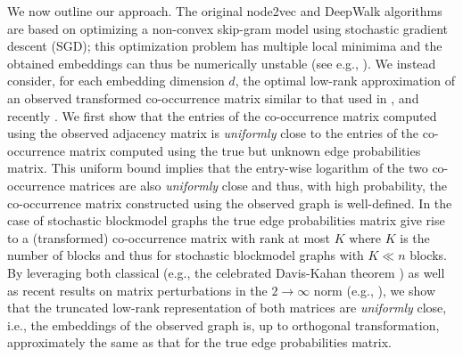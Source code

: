 \documentclass[10pt,journal,compsoc]{IEEEtran}
\numberwithin{equation}{section}
\begin{document}
We now outline our approach. The original node2vec and DeepWalk
algorithms are based on optimizing a non-convex skip-gram model using
stochastic gradient descent (SGD); this optimization problem has multiple local minimima and the obtained embeddings can thus
be numerically unstable (see e.g., \cite{surprising}). We instead consider, for each embedding
dimension $d$, the optimal low-rank approximation
of an observed transformed co-occurrence matrix similar to that used in 
\cite{levy2014neural,qiu2020concentration}, and recently \cite{barot2021community,sussman_vec}. We first
show that the entries of the co-occurrence matrix computed using
the observed adjacency matrix is {\em uniformly} close to the entries
of the co-occurrence matrix computed using the true but unknown edge
probabilities matrix. This uniform bound implies that the
entry-wise logarithm of the two co-occurrence matrices are
also {\em uniformly} close %
and thus, with high probability, the
co-occurrence matrix constructed using the observed
graph is well-defined. %
%
In the case of stochastic
blockmodel graphs the true edge probabilities matrix give rise to a (transformed) co-occurrence matrix with rank at most $K$ where $K$ is the number of
blocks and thus for stochastic blockmodel graphs with $K \ll n$ blocks. By leveraging both classical (e.g., the celebrated Davis-Kahan theorem \cite{davis70}) as well as recent results on matrix perturbations in the $2 \to \infty$ norm (e.g., \cite{cape2019two,lei2019unified}), we show that the truncated
low-rank representation of both matrices are {\em uniformly} close, i.e., the
embeddings of the observed graph is, up to
orthogonal transformation, approximately the same as that for the
true edge probabilities matrix. %
\end{document}
